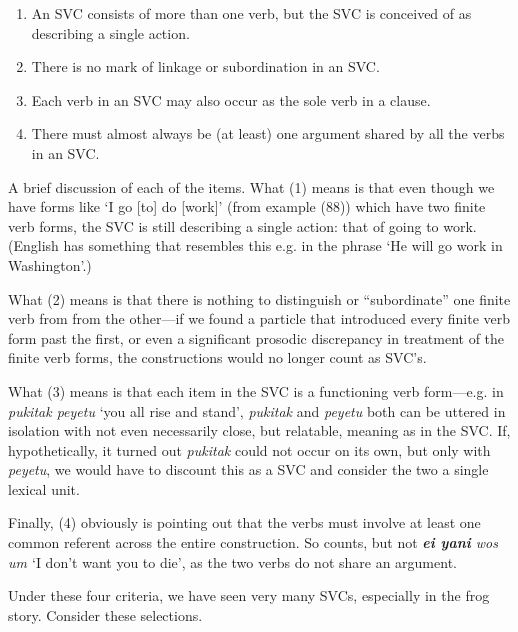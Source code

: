 \documentclass[pdftex,12pt,letterpaper]{article}
\let\ipa\textipa
\let\enya\textltailn
\begin{document}
\begin{enumerate}
\item An SVC consists of more than one verb, but the SVC is conceived of as describing a single action.
\item There is no mark of linkage or subordination in an SVC.
\item Each verb in an SVC may also occur as the sole verb in a clause.
\item There must almost always be (at least) one argument shared by all the verbs in an SVC.
\end{enumerate}

A brief discussion of each of the items. What (1) means is that even though we have forms like \emph{\ipa{y@na yene}} `I go [to] do [work]' (from example (88)) which have two finite verb forms, the SVC is still describing a single action: that of going to work. (English has something that resembles this e.g. in the phrase `He will go work in Washington'.)

What (2) means is that there is nothing to distinguish or ``subordinate'' one finite verb from from the other---if we found a particle that introduced every finite verb form past the first, or even a significant prosodic discrepancy in treatment of the finite verb forms, the constructions would no longer count as SVC's. 

What (3) means is that each item in the SVC is a functioning verb form---e.g. in \emph{pukitak peyetu} `you all rise and stand', \emph{pukitak} and \emph{peyetu} both can be uttered in isolation with not even necessarily close, but relatable, meaning as in the SVC. If, hypothetically, it turned out \emph{pukitak} could not occur on its own, but only with \emph{peyetu}, we would have to discount this as a SVC and consider the two a single lexical unit.

Finally, (4) obviously is pointing out that the verbs must involve at least one common referent across the entire construction. So \emph{\ipa{y@na yene}} counts, but not \emph{\textbf{ei yani} wos um \textbf{\ipa{\enya@} \ipa{\enya ug@k}}} `I don't want you to die', as the two verbs do not share an argument.

Under these four criteria, we have seen very many SVCs, especially in the frog story. Consider these selections.
\end{document}
